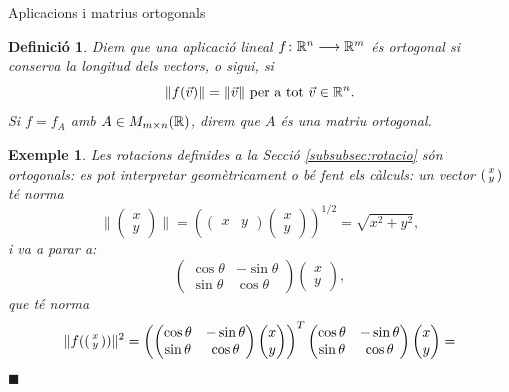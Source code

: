 \documentclass[
  11pt,
]{book}
\makeatletter
\numberwithin{dummy}{section}
\theoremstyle{maincolornumbox}
\theoremstyle{blacknumex}
\newtheorem{exampleT}{Exemple}[chapter]
\theoremstyle{blacknumbox}
\newtheorem{definitionT}{Definició}[chapter]
\theoremstyle{maincolornum}
\newenvironment{definition}{\begin{dBox}\begin{definitionT}}{\end{definitionT}\end{dBox}}
\newenvironment{example}{\begin{exampleT}}{\hfill{\tiny\ensuremath{\blacksquare}}\end{exampleT}}
\renewcommand{\section}{\@startsection{section}{1}{\z@}
{-4ex \@plus -1ex \@minus -.4ex}
{1ex \@plus.2ex }
{\normalfont\large\sffamily\bfseries}}
\makeatother
\begin{document}
\hypertarget{aplicacions-i-matrius-ortogonals}{%
\section{Aplicacions i matrius ortogonals}\label{aplicacions-i-matrius-ortogonals}}

\begin{definition}
Diem que una aplicació lineal \(f \colon \mathbb{R}^n\longrightarrow \mathbb{R}^m\) és \emph{ortogonal} si
conserva la longitud dels vectors, o sigui, si
\[\|f(\vec v)\|=\|\vec v\| \text{ per a tot $\vec v\in\mathbb{R}^n$.}\] Si
\(f=f_A\) amb \(A\in M_{m\times n}(\mathbb{R})\), direm que \(A\) és una \emph{matriu
ortogonal}.
\end{definition}

\begin{example}
Les rotacions definides a la Secció
\ref{subsubsec:rotacio} són ortogonals: es pot interpretar
geomètricament o bé fent els càlculs: un vector \(\left(\begin{smallmatrix}x\\y\end{smallmatrix}\right)\) té norma
\[\|\begin{pmatrix}x \\ y \end{pmatrix}\|=\left(\begin{pmatrix} x & y \end{pmatrix}\begin{pmatrix} x \\ y \end{pmatrix}\right)^{1/2} = \sqrt{x^2+y^2},\]
i va a parar a: \[\begin{pmatrix}
\cos\theta&-\sin\theta\\
\sin\theta&\cos\theta
\end{pmatrix}
\begin{pmatrix}x \\ y \end{pmatrix} ,\] que té norma \begin{align*}
\|f(\smat{x\\y})\|^2 & =\left( \begin{pmatrix}
\cos\theta&-\sin\theta\\
\sin\theta&\cos\theta
\end{pmatrix}
\begin{pmatrix}x \\ y \end{pmatrix}  \right)^T
\begin{pmatrix}
\cos\theta&-\sin\theta\\
\sin\theta&\cos\theta
\end{pmatrix}
\begin{pmatrix}x \\ y \end{pmatrix} = \\

\end{align*}
\end{example}
\end{document}
